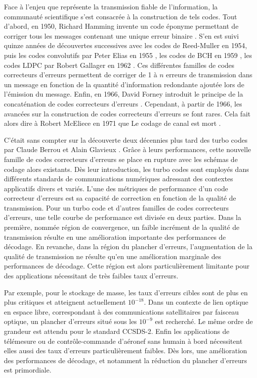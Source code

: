 Face à l'enjeu que représente la transmission fiable de l'information, la communauté scientifique s'est consacrée à la 
construction de tels codes. Tout d'abord, en 1950, Richard Hamming invente un code éponyme permettant de corriger tous 
les messages contenant une unique erreur binaire \cite{hamming}. S'en est suivi quinze années de découvertes successives avec les codes de Reed-Muller \cite{reedmuller1,reedmuller2} en 1954,
puis les codes convolutifs par Peter Elias en 1955 \cite{elias}, les codes de BCH en 1959 \cite{hocquenghem1959codes,bose1960class}, les codes LDPC par Robert Gallager en 1962 \cite{gallager1962low}.
Ces différentes familles de codes correcteurs d'erreurs permettent de corriger de 1 à $n$ erreurs de transmission dans un message en fonction de la quantité d'information redondante ajoutée lors de l'émission du message.
Enfin, en 1966, David Forney introduit le principe de la concaténation de codes correcteurs d'erreurs \cite{forney1966concatenated}. Cependant, à partir de 1966, les avancées
sur la construction de codes correcteurs d'erreurs se font rares. Cela fait alors dire à Robert McEliece en 1971 que 
\og Le codage de canal est mort \fg\cite{codingdead}. 

C'était sans compter sur la découverte deux décennies plus tard des turbo codes par Claude Berrou et Alain Glavieux \cite{berrouTC}. 
Grâce à leurs performances, cette nouvelle famille de codes correcteurs d'erreurs se place en rupture avec les
schémas de codage alors existants. Dès leur introduction, les turbo codes sont employés dans différents 
standards de communications numériques adressant des contextes applicatifs divers et variés. L'une des métriques de 
performance d'un code correcteur d'erreurs est sa capacité de correction en fonction de la qualité de transmission. 
Pour un turbo code et d'autres familles de codes correcteurs d'erreurs, une telle courbe de performance est divisée en deux parties. Dans la première, nommée région de 
convergence, un faible incrément de la qualité de transmission résulte en une amélioration importante des performances de
décodage. En revanche, dans la région du plancher d'erreurs, l'augmentation de la qualité de transmission ne résulte qu'en
une amélioration marginale des performances de décodage. Cette région est alors particulièrement limitante pour des applications
nécessitant de très faibles taux d'erreurs.

Par exemple, 
pour le stockage de masse, les taux d'erreurs cibles sont de plus en plus critiques et atteignent actuellement $10^{-18}$.
Dans un contexte de 
lien optique en espace libre, correspondant à des communications satellitaires par faisceau optique, un 
plancher d'erreurs situé sous les $10^{-9}$ est recherché. Le même ordre de grandeur est attendu pour le standard 
CCSDS-2. Enfin les applications de télémesure ou de 
contrôle-commande d'aéronef sans humain à bord nécessitent elles aussi des taux d'erreurs particulièrement faibles. Dès 
lors, une amélioration des performances de décodage, et notamment la réduction du plancher d'erreurs est primordiale.

